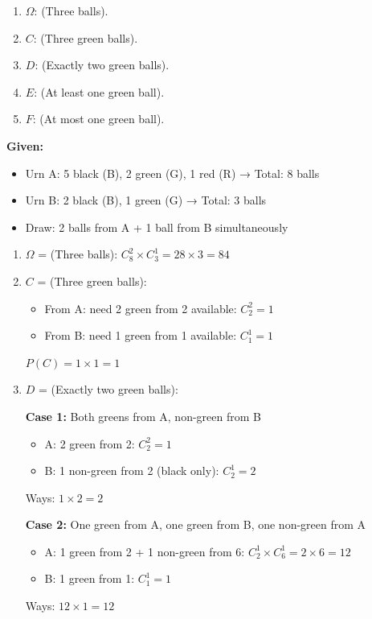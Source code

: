 \documentclass[12pt]{article}
\begin{document}
\begin{enumerate}
    \item $\Omega$: (Three balls).
    \item $C$: (Three green balls).
    \item $D$: (Exactly two green balls).
    \item $E$: (At least one green ball).
    \item $F$: (At most one green ball).
\end{enumerate}

\begin{correctionbox}
\textbf{Given:}
\begin{itemize}
    \item Urn A: 5 black (B), 2 green (G), 1 red (R) → Total: 8 balls
    \item Urn B: 2 black (B), 1 green (G) → Total: 3 balls
    \item Draw: 2 balls from A + 1 ball from B simultaneously
\end{itemize}

\begin{enumerate}
    \item $\Omega$ = (Three balls): $C_8^2 \times C_3^1 = 28 \times 3 = 84$
    
    \item $C$ = (Three green balls):
    \begin{itemize}
        \item From A: need 2 green from 2 available: $C_2^2 = 1$
        \item From B: need 1 green from 1 available: $C_1^1 = 1$
    \end{itemize}
    $P(C) = 1 \times 1 = 1$
    
    \item $D$ = (Exactly two green balls):
    
    \textbf{Case 1:} Both greens from A, non-green from B
    \begin{itemize}
        \item A: 2 green from 2: $C_2^2 = 1$
        \item B: 1 non-green from 2 (black only): $C_2^1 = 2$
    \end{itemize}
    Ways: $1 \times 2 = 2$
    
    \textbf{Case 2:} One green from A, one green from B, one non-green from A
    \begin{itemize}
        \item A: 1 green from 2 + 1 non-green from 6: $C_2^1 \times C_6^1 = 2 \times 6 = 12$
        \item B: 1 green from 1: $C_1^1 = 1$
    \end{itemize}
    Ways: $12 \times 1 = 12$
    

\end{enumerate}
\end{correctionbox}
\end{document}
